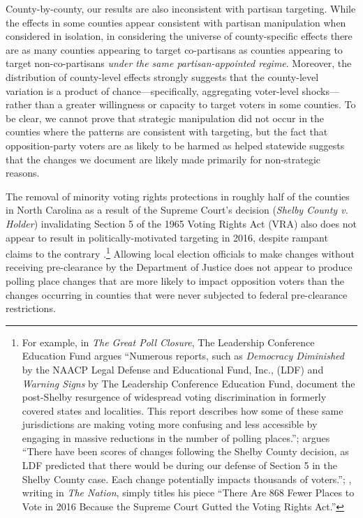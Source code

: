 \documentclass[12pt]{article}
\begin{document}
County-by-county, our results are also inconsistent with partisan targeting. While the effects in some counties appear consistent with partisan manipulation when considered in isolation, in considering the universe of county-specific effects there are as many counties appearing to target co-partisans as counties appearing to target non-co-partisans \emph{under the same partisan-appointed regime}.  Moreover, the distribution of county-level effects strongly suggests that the county-level variation is a product of chance---specifically, aggregating voter-level shocks---rather than a greater willingness or capacity to target voters in some counties.  To be clear, we cannot prove that strategic manipulation did not occur in the counties where the patterns are consistent with targeting, but the fact that opposition-party voters are as likely to be harmed as helped statewide suggests that the changes we document are likely made primarily for non-strategic reasons.


The removal of minority voting rights protections in roughly half of the counties in North Carolina as a result of the Supreme Court's decision (\textit{Shelby County v. Holder}) invalidating Section 5 of the 1965 Voting Rights Act (VRA) also does not appear to result in politically-motivated targeting in 2016, despite rampant claims to the contrary \citep{berman2016,insightus2016,Vasilogambros:2018wu,leadershipcoun2016}.\footnote{For example, in \emph{The Great Poll Closure}, The Leadership Conference Education Fund argues ``Numerous reports, such as \emph{Democracy Diminished} by the NAACP Legal Defense and Educational Fund, Inc., (LDF) and \emph{Warning Signs} by The Leadership Conference Education Fund, document the post-Shelby resurgence of widespread voting discrimination in formerly covered states and localities. This report describes how some of these same jurisdictions are making voting more confusing and less accessible by engaging in massive reductions in the number of polling places.''; \cite{NAACPLegalDefenseFund2016} argues ``There have been scores of changes following the Shelby County decision, as LDF predicted  that  there  would  be  during  our  defense  of  Section  5  in  the  Shelby  County  case.  Each  change  potentially  impacts thousands of voters.''; \cite{berman2016}, writing in \emph{The Nation}, simply titles his piece ``There Are 868 Fewer Places to Vote in 2016 Because the Supreme Court Gutted the Voting Rights Act.''} Allowing local election officials to make changes without receiving pre-clearance by the Department of Justice does not appear to produce polling place changes that are more likely to impact opposition voters than the changes occurring in counties that were never subjected to federal pre-clearance restrictions.
\end{document}
